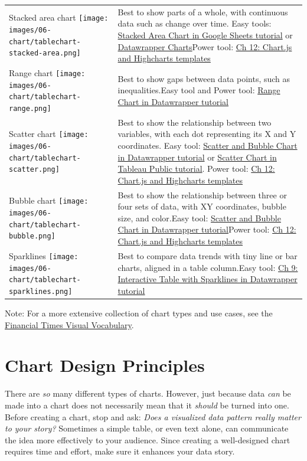 \documentclass[
  english,
]{book}
\begin{document}
\begin{longtable}[]{@{}
  >{\raggedright\arraybackslash}p{}
  >{\raggedright\arraybackslash}p{}@{}}
Stacked area chart \texttt{[image: images/06-chart/tablechart-stacked-area.png]} & Best to show parts of a whole, with continuous data such as change over time. Easy tools: \href{pie-line-area-google.html}{Stacked Area Chart in Google Sheets tutorial} or \href{chart-datawrapper.html}{Datawrapper Charts}Power tool: \href{chartcode.html}{Ch 12: Chart.js and Highcharts templates} \\
Range chart \texttt{[image: images/06-chart/tablechart-range.png]} & Best to show gaps between data points, such as inequalities.Easy tool and Power tool: \href{range-datawrapper.html}{Range Chart in Datawrapper tutorial} \\
Scatter chart \texttt{[image: images/06-chart/tablechart-scatter.png]} & Best to show the relationship between two variables, with each dot representing its X and Y coordinates. Easy tool: \href{scatter-bubble-datawrapper.html}{Scatter and Bubble Chart in Datawrapper tutorial} or \href{scatter-tableau.html}{Scatter Chart in Tableau Public tutorial}. Power tool: \href{chartcode.html}{Ch 12: Chart.js and Highcharts templates} \\
Bubble chart \texttt{[image: images/06-chart/tablechart-bubble.png]} & Best to show the relationship between three or four sets of data, with XY coordinates, bubble size, and color.Easy tool: \href{scatter-bubble-datawrapper.html}{Scatter and Bubble Chart in Datawrapper tutorial}Power tool: \href{chartcode.html}{Ch 12: Chart.js and Highcharts templates} \\
Sparklines \texttt{[image: images/06-chart/tablechart-sparklines.png]} & Best to compare data trends with tiny line or bar charts, aligned in a table column.Easy tool: \href{table-datawrapper.html}{Ch 9: Interactive Table with Sparklines in Datawrapper tutorial} \\
\bottomrule
\end{longtable}

Note: For a more extensive collection of chart types and use cases, see the \href{https://ft.com/vocabulary}{Financial Times Visual Vocabulary}.

\hypertarget{chart-design}{%
\section*{Chart Design Principles}\label{chart-design}}

There are \emph{so} many different types of charts. However, just because data \emph{can} be made into a chart does not necessarily mean that it \emph{should} be turned into one. Before creating a chart, stop and ask: \emph{Does a visualized data pattern really matter to your story?} Sometimes a simple table, or even text alone, can communicate the idea more effectively to your audience. Since creating a well-designed chart requires time and effort, make sure it enhances your data story.
\end{document}
